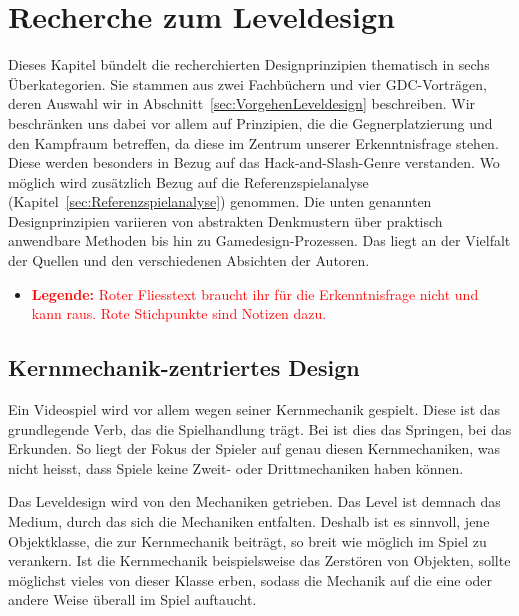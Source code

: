 \documentclass[../Main.tex]{subfiles}
\begin{document}
\section{Recherche zum Leveldesign} \label{sec:Leveldesign}
Dieses Kapitel bündelt die recherchierten Designprinzipien thematisch in sechs Überkategorien. Sie stammen aus zwei Fachbüchern und vier GDC-Vorträgen, deren Auswahl wir in Abschnitt~\ref{sec:VorgehenLeveldesign} beschreiben. Wir beschränken uns dabei vor allem auf Prinzipien, die die Gegnerplatzierung und den Kampfraum betreffen, da diese im Zentrum unserer Erkenntnisfrage stehen. Diese werden besonders in Bezug auf das Hack-and-Slash-Genre verstanden. Wo möglich wird zusätzlich Bezug auf die Referenzspielanalyse (Kapitel~\ref{sec:Referenzspielanalyse}) genommen. Die unten genannten Designprinzipien variieren von abstrakten Denkmustern über praktisch anwendbare Methoden bis hin zu Gamedesign-Prozessen. Das liegt an der Vielfalt der Quellen und den verschiedenen Absichten der Autoren.
\begin{itemize}[leftmargin=1.5cm]
    \item \textcolor{red}{\textbf{Legende:} Roter Fliesstext braucht ihr für die Erkenntnisfrage nicht und kann raus. Rote Stichpunkte sind Notizen dazu.}
\end{itemize}

\subsection{Kernmechanik-zentriertes Design} \label{sec:Kernmechanik}

Ein Videospiel wird vor allem wegen seiner Kernmechanik gespielt. Diese ist das grundlegende Verb, das die Spielhandlung trägt.\autocite[110]{totten2014architectural} Bei  ist dies das Springen, bei  das Erkunden.\autocite{nintendo_supermariobros_1985,nintendo_zelda_1986} So liegt der Fokus der Spieler auf genau diesen Kernmechaniken, was nicht heisst, dass Spiele keine Zweit- oder Drittmechaniken haben können.

Das Leveldesign wird von den Mechaniken getrieben. Das Level ist demnach das Medium, durch das sich die Mechaniken entfalten.\autocite{gdc_tenprinciples2010} Deshalb ist es sinnvoll, jene Objektklasse, die zur Kernmechanik beiträgt, so breit wie möglich im Spiel zu verankern. Ist die Kernmechanik beispielsweise das Zerstören von Objekten, sollte möglichst vieles von dieser Klasse erben, sodass die Mechanik auf die eine oder andere Weise überall im Spiel auftaucht.\autocite{gdc_movingmountains2020}
\end{document}
